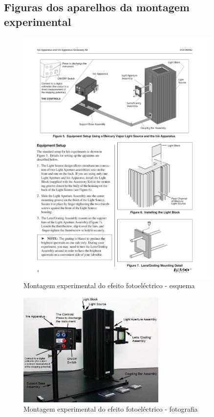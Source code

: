 \documentclass[a4paper,twoside,11pt]{report}      %
\begin{document}
 \subsection{\sf Figuras dos aparelhos da montagem experimental}
 \begin{figure}[htb] 
	\centering 
	\includegraphics[width=0.9\textwidth]{planckPasco} 
	\caption{Montagem experimental do efeito fotoeléctrico - esquema} 
	\label{fig:plackPasco}
\end{figure}

 \begin{figure}[htb] 
	\centering 
	\includegraphics[width=0.65\textwidth]{Planck_setup} 
	\caption{Montagem experimental do efeito fotoeléctrico - fotografia} 
\end{figure}
\end{document}
